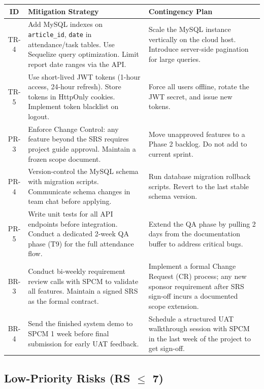 \documentclass[12pt,a4paper]{article}
\begin{document}
\begin{center}
\small
\begin{tabularx}{\textwidth}{c X X}
\toprule
\textbf{ID} & \textbf{Mitigation Strategy} & \textbf{Contingency Plan} \\
\midrule
TR-4 & Add MySQL indexes on \texttt{article\_id}, \texttt{date} in attendance/task tables. Use Sequelize query optimization. Limit report date ranges via the API. & Scale the MySQL instance vertically on the cloud host. Introduce server-side pagination for large queries. \\[6pt]
TR-5 & Use short-lived JWT tokens (1-hour access, 24-hour refresh). Store tokens in HttpOnly cookies. Implement token blacklist on logout. & Force all users offline, rotate the JWT secret, and issue new tokens. \\[6pt]
PR-3 & Enforce Change Control: any feature beyond the SRS requires project guide approval. Maintain a frozen scope document. & Move unapproved features to a Phase 2 backlog. Do not add to current sprint. \\[6pt]
PR-4 & Version-control the MySQL schema with migration scripts. Communicate schema changes in team chat before applying. & Run database migration rollback scripts. Revert to the last stable schema version. \\[6pt]
PR-5 & Write unit tests for all API endpoints before integration. Conduct a dedicated 2-week QA phase (T9) for the full attendance flow. & Extend the QA phase by pulling 2 days from the documentation buffer to address critical bugs. \\[6pt]
BR-3 & Conduct bi-weekly requirement review calls with SPCM to validate all features. Maintain a signed SRS as the formal contract. & Implement a formal Change Request (CR) process; any new sponsor requirement after SRS sign-off incurs a documented scope extension. \\[6pt]
BR-4 & Send the finished system demo to SPCM 1 week before final submission for early UAT feedback. & Schedule a structured UAT walkthrough session with SPCM in the last week of the project to get sign-off. \\[6pt]
\bottomrule
\end{tabularx}
\end{center}

\subsection{Low-Priority Risks (RS $\leq$ 7)}
\end{document}
